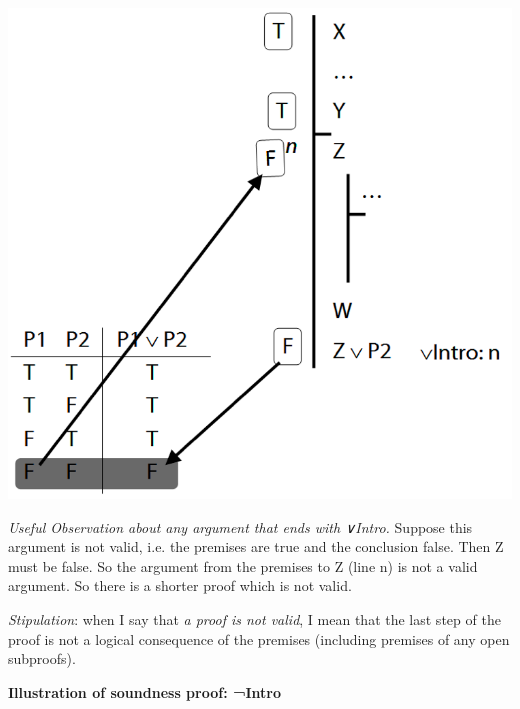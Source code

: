 \documentclass[12pt]{extarticle}
\begin{document}
\begin{multicols*}{3}
\begin{minipage}{\columnwidth}
\begin{center}
\includegraphics[scale=0.3]{img/soundness_or.png}
\end{center}
\end{minipage}
 
\emph{Useful Observation about any argument that ends with ∨Intro.} Suppose this argument is not valid, i.e. the premises are true and the conclusion false. Then Z must be false. So the argument from the premises to Z (line n) is not a valid argument. So there is a shorter proof which is not valid.
 
\emph{Stipulation}: when I say that \emph{a proof is not valid}, I mean that the last step of the proof is not a logical consequence of the premises (including premises of any open subproofs).
 
\begin{minipage}{\columnwidth}
 
\textbf{Illustration of soundness proof: ¬Intro}
 

\end{minipage}
\end{multicols*}
\end{document}
